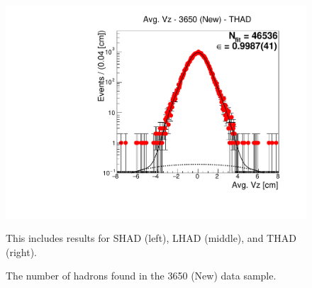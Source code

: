 \begin{figure}[H]
\includegraphics[scale=0.25]{figures/plots/nonDDbar_fit_results/3650_new/fit_new_3650_data_THAD.pdf}
\caption{The number of hadrons found in the 3650 (New) data sample.}
{This includes results for SHAD (left), LHAD (middle), and THAD (right).}
\label{fig:hadron_fits_3650_new}
\end{figure}


